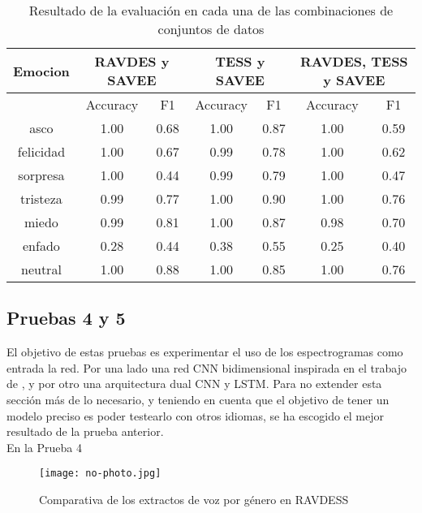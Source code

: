 \documentclass[11pt,a4paper,spanish]{book}
\begin{document}
	
	\begin{table}[H]
		\centering
		\begin{center}
			\begin{tabular}{| c|| c c |  c c |  c c | }
				\hline
					\multicolumn{1}{|c||}{Emocion} & 
					\multicolumn{2}{|c|}{RAVDES y SAVEE}&
					\multicolumn{2}{|c|}{TESS y SAVEE} &
					\multicolumn{2}{|c|}{RAVDES, TESS y SAVEE} \\
				\hline
				 	& 
					 \multicolumn{1}{|c|}{Accuracy}&\multicolumn{1}{|c|}{F1}&
					 \multicolumn{1}{|c|}{Accuracy}&\multicolumn{1}{|c|}{F1}&
					 \multicolumn{1}{|c|}{Accuracy}&\multicolumn{1}{|c|}{F1}\\
				\hline

				asco 		& 1.00 & 0.68 & 1.00 & 0.87 & 1.00 & 0.59\\
				felicidad 	& 1.00 & 0.67 & 0.99 & 0.78 & 1.00 & 0.62\\
				sorpresa 	& 1.00 & 0.44 & 0.99 & 0.79 & 1.00 & 0.47\\
				tristeza 	& 0.99 & 0.77 & 1.00 & 0.90 & 1.00 & 0.76\\
				miedo 		& 0.99 & 0.81 & 1.00 & 0.87 & 0.98 & 0.70\\
				enfado 		& 0.28 & 0.44 & 0.38 & 0.55 & 0.25 & 0.40\\
				neutral 	& 1.00 & 0.88 & 1.00 & 0.85 & 1.00 & 0.76\\
				\hline
			\end{tabular}
			
			\caption{Resultado de la evaluación en cada una de las combinaciones de conjuntos de datos}
			\label{result_Test3}
		\end{center}
	\end{table}
	
	
	\subsection{Pruebas 4 y 5}
	El objetivo de estas pruebas es experimentar el uso de los espectrogramas como entrada la red. Por una lado una red CNN bidimensional inspirada en el trabajo de \cite{Mustaqeem2020}, y por otro una arquitectura dual CNN y LSTM. Para no extender esta sección más de lo necesario, y teniendo en cuenta que el objetivo de tener un modelo preciso es poder testearlo con otros idiomas, se ha escogido el mejor resultado de la prueba anterior.\\
	\Large En la Prueba 4
	
	\begin{figure}[H]
		\centering
		\texttt{[image: no-photo.jpg]} 
		\caption{Comparativa de los extractos de voz por género en RAVDESS}
		\label{fig:cnn2d}
	\end{figure}
	
\end{document}
